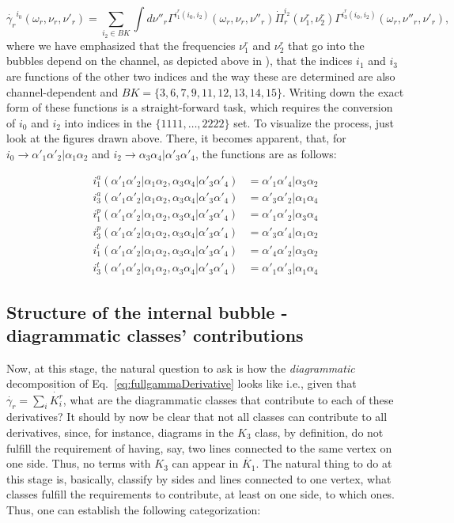 \documentclass[12pt,a4paper,roman]{article}
\begin{document}
\begin{equation}
\dot{\gamma_r}^{i_0}(\omega_r, \nu_r, \nu'_r) = \sum_{i_2\in BK} \int d\nu''_r \Gamma^{i^r_1(i_0, i_2)}(\omega_r, \nu_r, \nu''_r)  \dot{\Pi}_r^{i_2}(\nu_1^r, \nu_2^r)  \Gamma^{i^r_3(i_0, i_2)}(\omega_r, \nu''_r, \nu'_r),
\label{eq:fullgammaDerivative}
\end{equation}
where we have emphasized that the frequencies $\nu^r_{1}$ and $\nu^r_2$ that go into the bubbles depend on the channel, as depicted above in ), that the indices $i_1$ and $i_3$ are functions of the other two indices and the way these are determined are also channel-dependent and $BK = \{3, 6, 7, 9, 11, 12, 13, 14, 15\}$.
Writing down the exact form of these functions is a straight-forward task, which requires the conversion of $i_0$ and $i_2$ into indices in the $\{1111, \dots, 2222\}$ set. To visualize the process, just look at the figures drawn above. There, it becomes apparent, that, for $i_0 \rightarrow \alpha'_1\alpha'_2|\alpha_1\alpha_2$ and $i_2 \rightarrow \alpha_3\alpha_4|\alpha'_3\alpha'_4$, the functions are as follows:

\begin{align}
i_1^a (\alpha'_1\alpha'_2|\alpha_1\alpha_2, \alpha_3\alpha_4|\alpha'_3\alpha'_4) &= \alpha'_1\alpha'_4| \alpha_3\alpha_2 \\
i_3^a (\alpha'_1\alpha'_2|\alpha_1\alpha_2, \alpha_3\alpha_4|\alpha'_3\alpha'_4) &= \alpha'_3\alpha'_2| \alpha_1\alpha_4 \\
i_1^p (\alpha'_1\alpha'_2|\alpha_1\alpha_2, \alpha_3\alpha_4|\alpha'_3\alpha'_4) &= \alpha'_1\alpha'_2| \alpha_3\alpha_4 \\
i_3^p (\alpha'_1\alpha'_2|\alpha_1\alpha_2, \alpha_3\alpha_4|\alpha'_3\alpha'_4) &= \alpha'_3\alpha'_4| \alpha_1\alpha_2 \\
i_1^t (\alpha'_1\alpha'_2|\alpha_1\alpha_2, \alpha_3\alpha_4|\alpha'_3\alpha'_4) &= \alpha'_4\alpha'_2| \alpha_3\alpha_2 \\
i_3^t (\alpha'_1\alpha'_2|\alpha_1\alpha_2, \alpha_3\alpha_4|\alpha'_3\alpha'_4) &= \alpha'_1\alpha'_3| \alpha_1\alpha_4
\end{align}
\subsection*{Structure of the internal bubble - diagrammatic classes' contributions}
Now, at this stage, the natural question to ask is how the \textit{diagrammatic} decomposition of Eq.~\eqref{eq:fullgammaDerivative} looks like i.e., given that $\dot{\gamma_r} = \sum_i \dot{K_i^r}$, what are the diagrammatic classes that contribute to each of these derivatives? It should by now be clear that not all classes can contribute to all derivatives, since, for instance, diagrams in the $K_3$ class, by definition, do not fulfill the requirement of having, say, two lines connected to the same vertex on one side. Thus, no terms with $K_3$ can appear in $\dot{K_1}$.
The natural thing to do at this stage is, basically, classify by sides and lines connected to one vertex, what classes fulfill the requirements to contribute, at least on one side, to which ones.
Thus, one can establish the following categorization:
\end{document}
